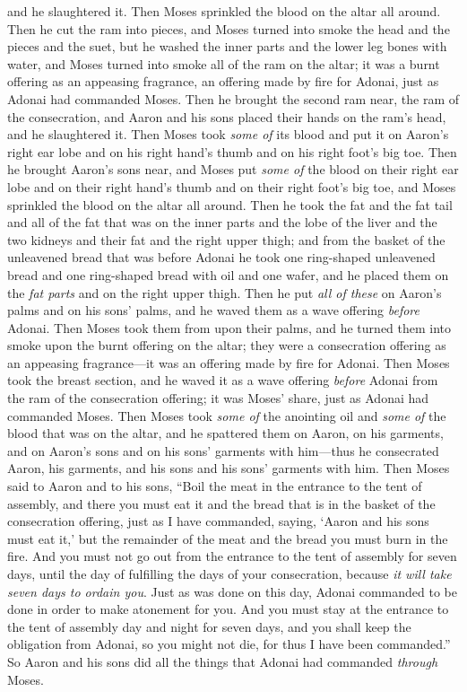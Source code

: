 \begin{biblechapter}
\verse and he slaughtered it. Then Moses sprinkled the blood on the altar all around.
\verse Then he cut the ram into pieces, and Moses turned into smoke the head and the pieces and the suet,
\verse but he washed the inner parts and the lower leg bones with water, and Moses turned into smoke all of the ram on the altar; it was a burnt offering as an appeasing fragrance, an offering made by fire for Adonai, just as Adonai had commanded Moses.
\verse Then he brought the second ram near, the ram of the consecration, and Aaron and his sons placed their hands on the ram’s head,
\verse and he slaughtered it. Then Moses took \textit{some of} its blood and put it on Aaron’s right ear lobe and on his right hand’s thumb and on his right foot’s big toe.
\verse Then he brought Aaron’s sons near, and Moses put \textit{some of} the blood on their right ear lobe and on their right hand’s thumb and on their right foot’s big toe, and Moses sprinkled the blood on the altar all around.
\verse Then he took the fat and the fat tail and all of the fat that was on the inner parts and the lobe of the liver and the two kidneys and their fat and the right upper thigh;
\verse and from the basket of the unleavened bread that was before Adonai he took one ring-shaped unleavened bread and one ring-shaped bread with oil and one wafer, and he placed them on the \textit{fat parts} and on the right upper thigh.
\verse Then he put \textit{all of these} on Aaron’s palms and on his sons’ palms, and he waved them as a wave offering \textit{before} Adonai.
\verse Then Moses took them from upon their palms, and he turned them into smoke upon the burnt offering on the altar; they were a consecration offering as an appeasing fragrance—it was an offering made by fire for Adonai.
\verse Then Moses took the breast section, and he waved it as a wave offering \textit{before} Adonai from the ram of the consecration offering; it was Moses’ share, just as Adonai had commanded Moses.
 Then Moses took \textit{some of} the anointing oil and \textit{some of} the blood that was on the altar, and he spattered them on Aaron, on his garments, and on Aaron’s sons and on his sons’ garments with him—thus he consecrated Aaron, his garments, and his sons and his sons’ garments with him.
\verse Then Moses said to Aaron and to his sons, “Boil the meat in the entrance to the tent of assembly, and there you must eat it and the bread that is in the basket of the consecration offering, just as I have commanded, saying, ‘Aaron and his sons must eat it,’
\verse but the remainder of the meat and the bread you must burn in the fire.
\verse And you must not go out from the entrance to the tent of assembly for seven days, until the day of fulfilling the days of your consecration, because \textit{it will take seven days to ordain you}.
\verse Just as was done on this day, Adonai commanded to be done in order to make atonement for you.
\verse And you must stay at the entrance to the tent of assembly day and night for seven days, and you shall keep the obligation from Adonai, so you might not die, for thus I have been commanded.”
\verse So Aaron and his sons did all the things that Adonai had commanded \textit{through} Moses.
\end{biblechapter}

